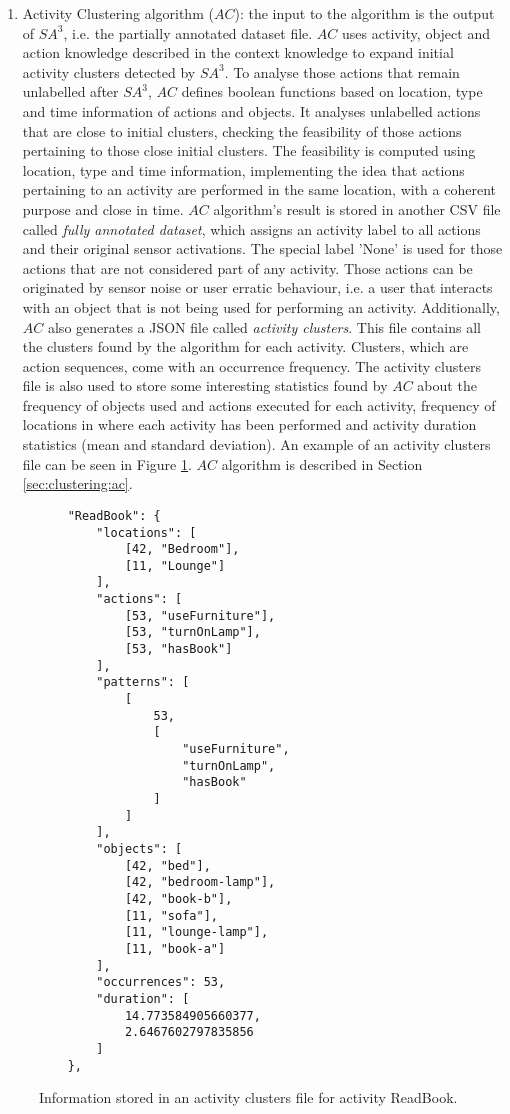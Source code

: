 \begin{enumerate}
 \item Activity Clustering algorithm ($AC$): the input to the algorithm is the output of $SA^3$, i.e. the partially annotated dataset file. $AC$ uses activity, object and action knowledge described in the context knowledge to expand initial activity clusters detected by $SA^3$. To analyse those actions that remain unlabelled after $SA^3$, $AC$ defines boolean functions based on location, type and time information of actions and objects. It analyses unlabelled actions that are close to initial clusters, checking the feasibility of those actions pertaining to those close initial clusters. The feasibility is computed using location, type and time information, implementing the idea that actions pertaining to an activity are performed in the same location, with a coherent purpose and close in time. $AC$ algorithm's result is stored in another CSV file called \textit{fully annotated dataset}, which assigns an activity label to all actions and their original sensor activations. The special label 'None' is used for those actions that are not considered part of any activity. Those actions can be originated by sensor noise or user erratic behaviour, i.e. a user that interacts with an object that is not being used for performing an activity. Additionally, $AC$ also generates a JSON file called \textit{activity clusters}. This file contains all the clusters found by the algorithm for each activity. Clusters, which are action sequences, come with an occurrence frequency. The activity clusters file is also used to store some interesting statistics found by $AC$ about the frequency of objects used and actions executed for each activity, frequency of locations in where each activity has been performed and activity duration statistics (mean and standard deviation). An example of an activity clusters file can be seen in Figure \ref{fig-clusters-file}. $AC$ algorithm is described in Section \ref{sec:clustering:ac}.
\end{enumerate}

\begin{figure}[htbp]
\begin{small}
\begin{lstlisting}
    "ReadBook": {
        "locations": [
            [42, "Bedroom"], 
            [11, "Lounge"]
        ], 
        "actions": [
            [53, "useFurniture"], 
            [53, "turnOnLamp"], 
            [53, "hasBook"]
        ], 
        "patterns": [
            [
                53, 
                [
                    "useFurniture", 
                    "turnOnLamp", 
                    "hasBook"
                ]
            ]
        ], 
        "objects": [
            [42, "bed"], 
            [42, "bedroom-lamp"], 
            [42, "book-b"], 
            [11, "sofa"], 
            [11, "lounge-lamp"], 
            [11, "book-a"]
        ], 
        "occurrences": 53, 
        "duration": [
            14.773584905660377, 
            2.6467602797835856
        ]
    }, 
\end{lstlisting}
\end{small}
\caption{Information stored in an activity clusters file for activity ReadBook.}
\label{fig-clusters-file}
\end{figure}


